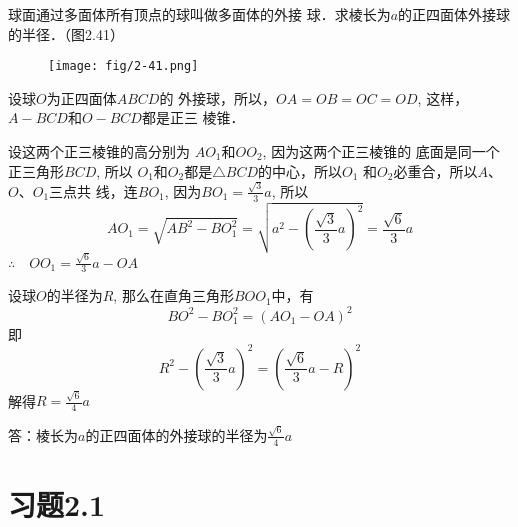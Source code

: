 \begin{example}
    球面通过多面体所有顶点的球叫做多面体的外接
球．求棱长为$a$的正四面体外接球的半径．（图2.41）
\end{example}

\begin{figure}[htp]
    \centering
\texttt{[image: fig/2-41.png]}
    \caption{}
\end{figure}

\begin{solution}
设球$O$为正四面体$ABCD$的
外接球，所以，$OA=OB=OC=OD$, 
这样，$A-BCD$和$O-BCD$都是正三
棱锥．

设这两个正三棱锥的高分别为
$AO_1$和$OO_2$, 因为这两个正三棱锥的
底面是同一个正三角形$BCD$, 所以
$O_1$和$O_2$都是$\triangle BCD$的中心，所以$O_1$
和$O_2$必重合，所以$A$、$O$、$O_1$三点共
线，连$BO_1$, 因为$BO_1=\frac{\sqrt{3}}{3}a$, 所以
\[AO_1=\sqrt{AB^2-BO_1^2}=\sqrt{a^2-\left(\frac{\sqrt{3}}{3}a\right)^2}=\frac{\sqrt{6}}{3}a\]
$\therefore\quad OO_1=\frac{\sqrt{6}}{3}a-OA$

设球$O$的半径为$R$, 那么在直角三角形$BOO_1$中，有
\[BO^2-BO_1^2=(AO_1-OA)^2\]
即\[R^2-\left(\frac{\sqrt{3}}{3}a\right)^2=\left(\frac{\sqrt{6}}{3}a-R\right)^2\]
解得$R=\frac{\sqrt{6}}{4}a$

答：棱长为$a$的正四面体的外接球的半径为$\frac{\sqrt{6}}{4}a$
\end{solution}

\section*{习题2.1}

